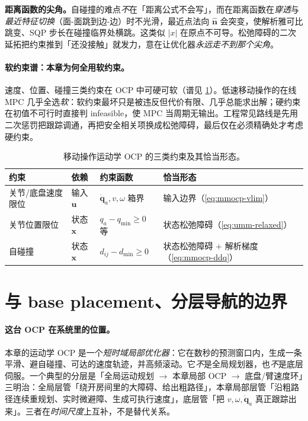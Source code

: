 \begin{note}
\textbf{距离函数的尖角。}\;自碰撞的难点\emph{不}在「距离公式不会写」，而在距离函数在\emph{穿透}与\emph{最近特征切换}（面-面跳到边-边）时不光滑，最近点法向 $\hat{\mathbf n}$ 会突变，使解析雅可比跳变、SQP 步长在碰撞临界处横跳。这类似 $|x|$ 在原点不可导。松弛障碍的二次延拓把约束推到「还没接触」就发力，意在让优化器\emph{永远走不到那个尖角}。
\end{note}

\paragraph{软约束谱：本章为何全用软约束。}
速度、位置、碰撞三类约束在 OCP 中可硬可软（谱见 \cref{tab:mmocp-constr}）。低速移动操作的在线 MPC 几乎全选\emph{软}：软约束最坏只是被违反但代价有限、几乎总能求出解；硬约束在初值不可行时直接判 infeasible，使 MPC 当周期无输出。工程常见路线是先用二次惩罚把跟踪调通，再把安全相关项换成松弛障碍，最后仅在必须精确处才考虑硬约束。

\begin{table}[H]\centering\small
\caption{移动操作运动学 OCP 的三类约束及其恰当形态。}
\label{tab:mmocp-constr}
\begin{tabular}{llll}
\toprule
约束 & 依赖 & 约束函数 & 恰当形态 \\
\midrule
关节/底盘速度限位 & 输入 $\mathbf u$ & $\dot{\mathbf q}_a,v,\omega$ 箱界 & 输入边界（\cref{eq:mmocp-vlim}） \\
关节位置限位 & 状态 $\mathbf x$ & $q_{a}-q_{\min}\ge0$ 等 & 状态松弛障碍（\cref{eq:umm-relaxed}） \\
自碰撞 & 状态 $\mathbf x$ & $d_{ij}-d_{\min}\ge0$ & 状态松弛障碍 $+$ 解析梯度（\cref{eq:mmocp-ddq}） \\
\bottomrule
\end{tabular}
\end{table}

\section{与 base placement、分层导航的边界}
\label{sec:mmocp-stack}

\paragraph{这台 OCP 在系统里的位置。}
本章的运动学 OCP 是一个\emph{短时域局部优化器}：它在数秒的预测窗口内，生成一条平滑、避自碰撞、可达的速度轨迹，并高频滚动。它\emph{不}是全局规划器，也\emph{不}是底层伺服。一个典型的分层是「全局运动规划 $\to$ 本章局部 OCP $\to$ 底盘/臂速度环」三明治：全局层管「绕开房间里的大障碍、给出粗路径」，本章局部层管「沿粗路径连续重规划、实时微避障、生成可执行速度」，底层管「把 $v,\omega,\dot{\mathbf q}_a$ 真正跟踪出来」。三者在\emph{时间尺度}上互补，不是替代关系。

